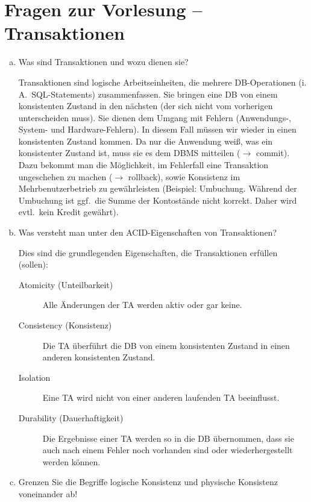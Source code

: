 \section{Fragen zur Vorlesung -- Transaktionen}

\begin{enumerate}[a)]

	\item Was sind Transaktionen und wozu dienen sie?

	\begin{solution}
	Transaktionen sind logische Arbeitseinheiten, die mehrere DB-Operationen (i.\,A.\ SQL-Statements) zusammenfassen. Sie bringen eine DB von einem konsistenten Zustand in den nächsten (der sich nicht vom vorherigen unterscheiden muss). Sie dienen dem Umgang mit Fehlern (Anwendungs-, System- und Hardware-Fehlern). In diesem Fall müssen wir wieder in einen konsistenten Zustand kommen. Da nur die Anwendung weiß, was ein konsistenter Zustand ist, muss sie es dem DBMS mitteilen ($\rightarrow$ commit). Dazu bekommt man die Möglichkeit, im Fehlerfall eine Transaktion ungeschehen zu machen ($\rightarrow$ rollback), sowie Konsistenz im Mehrbenutzerbetrieb zu gewährleisten (Beispiel: Umbuchung. Während der Umbuchung ist ggf.\ die Summe der Kontostände nicht korrekt. Daher wird evtl.\ kein Kredit gewährt).
	\end{solution}

	\item Was versteht man unter den ACID-Eigenschaften von Transaktionen?

	\begin{solution}
	Dies sind die grundlegenden Eigenschaften, die Transaktionen erfüllen (sollen):
	\begin{description}
		\item[Atomicity (Unteilbarkeit)] Alle Änderungen der TA werden aktiv oder gar keine.
		\item[Consistency (Konsistenz)] Die TA überführt die DB von einem konsistenten Zustand in einen anderen konsistenten Zustand.
		\item[Isolation] Eine TA wird nicht von einer anderen laufenden TA beeinflusst.
		\item[Durability (Dauerhaftigkeit)] Die Ergebnisse einer TA werden so in die DB übernommen, dass sie auch nach einem Fehler noch vorhanden sind oder wiederhergestellt werden können.
	\end{description}
	\end{solution}

	\item Grenzen Sie die Begriffe logische Konsistenz und physische Konsistenz voneinander ab!


\end{enumerate}
